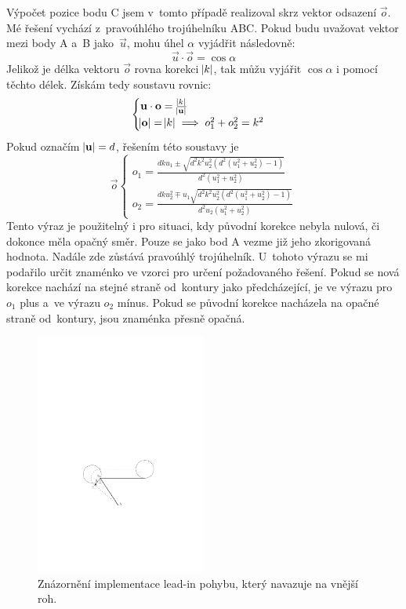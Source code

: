 			Výpočet pozice bodu C jsem v~tomto případě realizoval skrz vektor odsazení $\vec{o}$. Mé řešení vychází z~pravoúhlého trojúhelníku ABC. Pokud budu uvažovat vektor mezi body A a~B jako~$\vec{u}$, mohu úhel $\alpha$ vyjádřit následovně:
			\begin{equation}
				\vec{u}\cdot\vec{o}=\cos\alpha
			\end{equation}
			Jelikož je délka vektoru $\vec{o}$ rovna korekci $\abs{k}$, tak můžu vyjářit $\cos\alpha$ i pomocí těchto délek. Získám tedy soustavu rovnic:
			\begin{equation}
				\begin{cases}
					\mathbf{u}\cdot\mathbf{o} = \frac{\abs{k}}{\abs{\mathbf{u}}} \\
					\abs{\mathbf{o}}=\abs{k} \implies o_1^2+o_2^2=k^2
				\end{cases}
			\end{equation}
		Pokud označím $\abs{\mathbf{u}}=d$, řešením této soustavy je
			\begin{equation}
			\vec{o}
			\begin{cases}
				o_1=\frac{dku_1\pm\sqrt{d^2k^2u_2^2 \left(d^2\left(u_1^2+u_2^2\right)-1\right)}}{d^2\left( u_1^2+u_2^2\right)} \\
				o_2=\frac{dku_2^2\mp u_1\sqrt{d^2k^2u_2^2\left(d^2\left(u_1^2+u_2^2\right)-1\right)}}{d^2u_2(u_1^2+u_2^2)}
			\end{cases}
			\end{equation}
			Tento výraz je použitelný i pro situaci, kdy původní korekce nebyla nulová, či dokonce měla opačný směr. Pouze se jako bod A vezme již jeho zkorigovaná hodnota. Nadále zde zůstává pravoúhlý trojúhelník. U~tohoto výrazu se mi podařilo určit znaménko ve vzorci pro určení požadovaného řešení. Pokud se nová korekce nachází na stejné straně od~kontury jako předcházející, je ve výrazu pro $o_1$ plus a~ve výrazu $o_2$ mínus. Pokud se původní korekce nacházela na opačné straně od~kontury, jsou znaménka přesně opačná.
		
			\begin{figure}[h]
				\centering
				\includegraphics[width=0.5\textwidth]{img/korekce-leadin3.pdf}
				\caption{Znázornění implementace lead-in pohybu, který navazuje na vnější roh.}\label{nak:leadin3}	
			\end{figure}
			

